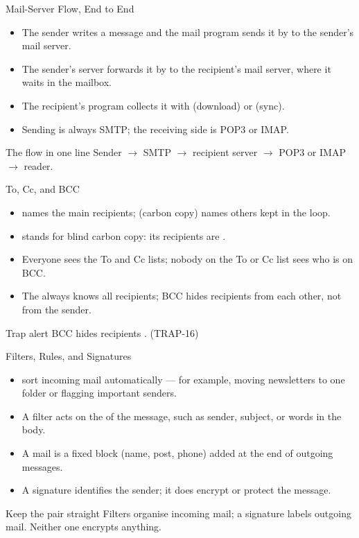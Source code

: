 \documentclass[aspectratio=169]{beamer}
\begin{document}
\begin{frame}{Mail-Server Flow, End to End}
  \begin{itemize}
    \item The sender writes a message and the mail program sends it by
       to the sender's mail server.
    \item The sender's server forwards it by  to the
      recipient's mail server, where it waits in the mailbox.
    \item The recipient's program collects it with  (download)
      or  (sync).
    \item Sending is always SMTP; the receiving side is POP3 or IMAP.
  \end{itemize}
  \begin{block}{The flow in one line}
    Sender $\rightarrow$ SMTP $\rightarrow$ recipient server
    $\rightarrow$ POP3 or IMAP $\rightarrow$ reader.
  \end{block}
\end{frame}

\begin{frame}{To, Cc, and BCC}
  \begin{itemize}
    \item {} names the main recipients;  (carbon copy)
      names others kept in the loop.
    \item {} stands for blind carbon copy: its recipients are
      .
    \item Everyone sees the To and Cc lists; nobody on the To or Cc
      list sees who is on BCC.
    \item The  always knows all recipients; BCC hides
      recipients from each other, not from the sender.
  \end{itemize}
  \begin{alertblock}{Trap alert}
    BCC hides recipients . (TRAP-16)
  \end{alertblock}
\end{frame}

\begin{frame}{Filters, Rules, and Signatures}
  \begin{itemize}
    \item {} sort incoming mail automatically ---
      for example, moving newsletters to one folder or flagging
      important senders.
    \item A filter acts on the  of the message,
      such as sender, subject, or words in the body.
    \item A mail  is a fixed block (name, post, phone)
      added at the end of outgoing messages.
    \item A signature identifies the sender; it does  encrypt
      or protect the message.
  \end{itemize}
  \begin{block}{Keep the pair straight}
    Filters organise incoming mail; a signature labels outgoing mail.
    Neither one encrypts anything.
  \end{block}
\end{frame}
\end{document}
